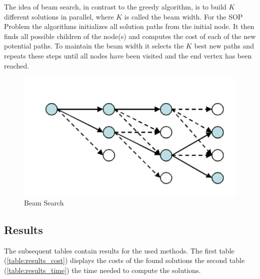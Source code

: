 \documentclass[]{article}
\begin{document}
    The idea of beam search, in contrast to the greedy algorithm, is to build $K$ different solutions in parallel, where $K$ is called the beam width. For the SOP Problem the algorithms initializes all solution paths from the initial node. It then finds all possible children of the node(s) and computes the cost of each of the new potential paths. To maintain the beam width it selects the $K$ best new paths and repeats these steps until all nodes have been visited and the end vertex has been reached. \cite{Beam:1} \cite{Beam:2} 

    \begin{figure}[hbt]
    	\includegraphics[]{files/beam_search.png}
    	\centering
    	\caption{Beam Search}
    \end{figure}


    \subsection{Results}
    \label{results}

    The subsequent tables contain results for the used methods. The first table (\ref{table:results_cost}) displays the costs of the found solutions the second table (\ref{table:results_time}) the time needed to compute the solutions. 
\end{document}
